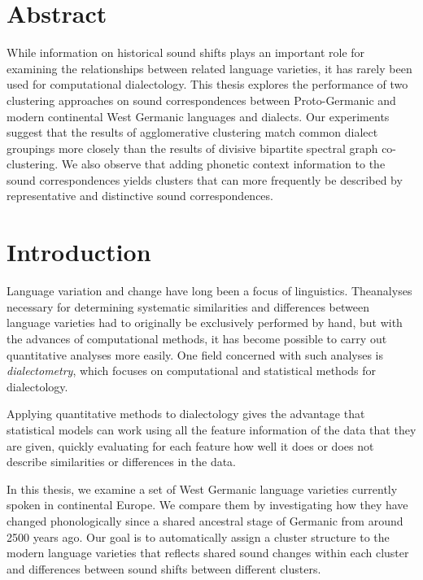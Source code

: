 \documentclass[a4paper]{article}
\begin{document}
\newpage

\section*{Abstract}
While information on historical sound shifts
plays an important role for examining
the relationships between related language varieties,
it has rarely been used for computational dialectology.
This thesis explores the performance of two clustering
approaches on sound correspondences between Proto-Germanic
and modern continental West Germanic languages and dialects.
Our experiments suggest that the results of agglomerative clustering
match common dialect groupings more closely
than the results of divisive bipartite spectral graph co-clustering.
We also observe that adding phonetic context information
to the sound correspondences yields clusters
that can more frequently be described by representative and distinctive
sound correspondences.

\newpage
\tableofcontents
\newpage
\listoftables
\listoffigures
\newpage


\section{Introduction}

Language variation and change have long been a focus of linguistics.
The\linebreak analyses necessary for determining
systematic similarities and differences between language varieties
had to originally be exclusively performed by hand,
but with the advances of computational methods,
it has become possible to carry out quantitative analyses more easily.
One field concerned with such analyses is \textit{dialectometry},
which focuses on computational and statistical methods for dialectology.

Applying quantitative methods to dialectology gives the advantage
that statistical models can work using all the feature
information of the data that they are given,
quickly evaluating for each feature how well it does or does not
describe similarities or differences in the data.

In this thesis, we examine a set of West Germanic language varieties
currently spoken in continental Europe.
We compare them by investigating how they have changed phonologically
since a shared ancestral stage of Germanic from around 2500 years ago.
Our goal is to automatically assign a cluster structure to the
modern language varieties that reflects shared sound changes
within each cluster and differences between sound shifts between different clusters.
\end{document}
